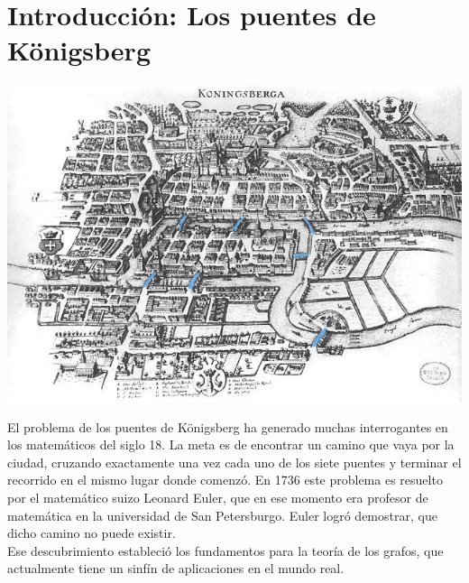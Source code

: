 \documentclass[12pt]{article}
\begin{document}
\section{Introducci\'{o}n: Los puentes de K\"{o}nigsberg}
\begin{center}
\includegraphics[scale=0.5]{koenigsberg.jpg}
\end{center}
El problema de los puentes de K\"{o}nigsberg ha generado muchas interrogantes en los matemáticos del siglo 18. La meta es de encontrar un camino que vaya por la ciudad, cruzando exactamente una vez cada uno de los siete puentes y terminar el recorrido en el mismo lugar donde comenzó. En 1736 este problema es resuelto por el matemático suizo Leonard Euler, que en ese momento era profesor de matemática en la universidad de San Petersburgo. Euler logró demostrar, que dicho camino no puede existir.\\ Ese descubrimiento estableci\'{o} los fundamentos para la teor\'{i}a de los grafos, que actualmente tiene un sinf\'{i}n de aplicaciones en el mundo real.
\end{document}
